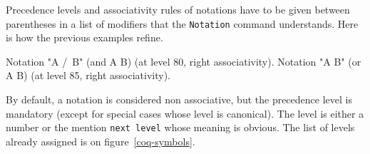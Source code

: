 Precedence levels and associativity rules of notations have to be
given between parentheses in a list of modifiers that the
\texttt{Notation} command understands. Here is how the previous
examples refine.

\begin{coq_example*}
Notation "A /\ B" (and A B) (at level 80, right associativity).
Notation "A \/ B" (or A B)  (at level 85, right associativity).
\end{coq_example*}

By default, a notation is considered non associative, but the
precedence level is mandatory (except for special cases whose level is
canonical). The level is either a number or the mention {\tt next
level} whose meaning is obvious. The list of levels already assigned
is on figure~\ref{coq-symbols}.

